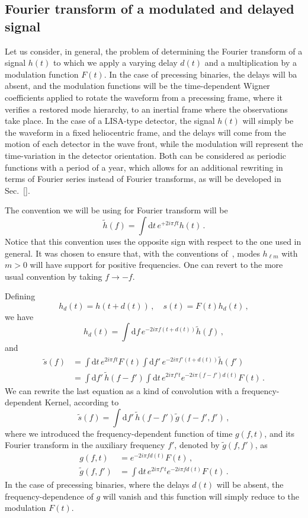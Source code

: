 \documentclass[aps,showpacs,%
prd,superscriptaddress,nofootinbib]{revtex4}
\newcommand{\be}{\begin{equation}}
\newcommand{\ee}{\end{equation}}
\newcommand\ud{{\mathrm{d}}}
\newcommand{\nn}{\nonumber}
\begin{document}

\subsection{Fourier transform of a modulated and delayed signal}
\label{subsec:FTgeneral}

Let us consider, in general, the problem of determining the Fourier transform of a signal $h(t)$ to which we apply a varying delay $d(t)$ and a multiplication by a modulation function $F(t)$. In the case of precessing binaries, the delays will ba absent, and the modulation functions will be the time-dependent Wigner coefficients applied to rotate the waveform from a precessing frame, where it verifies a restored mode hierarchy, to an inertial frame where the observations take place. In the case of a LISA-type detector, the signal $h(t)$ will simply be the waveform in a fixed heliocentric frame, and the delays will come from the motion of each detector in the wave front, while the modulation will represent the time-variation in the detector orientation. Both can be considered as periodic functions with a period of a year, which allows for an additional rewriting in terms of Fourier series instead of Fourier transforms, as will be developed in Sec.~\ref{}. 

The convention we will be using for Fourier transform will be
%
\be\label{eq:defFT}
	\tilde{h}(f) =  \int \ud t \, e^{+2i\pi f t} h(t) \,.
\ee
%
Notice that this convention uses the opposite sign with respect to the one used in general. It was chosen to ensure that, with the conventions of~\cite{}, modes $h_{\ell m}$ with $m>0$ will have support for positive frequencies. One can revert to the more usual convention by taking $f\rightarrow -f$.

Defining
%
\be
	h_{d}(t) = h(t+d(t)) \,, \quad s(t) = F(t)h_{d}(t) \,,
\ee
%
we have
%
\be
	h_{d}(t) = \int \ud f \, e^{-2i\pi f (t+d(t))}\tilde{h}(f) \,,
\ee
%
and
%
\begin{align}
	\tilde{s}(f) &= \int \ud t \, e^{2i\pi f t} F(t)  \int \ud f' \, e^{-2i\pi f' (t+d(t))}\tilde{h}(f') \nn\\
	&= \int \ud f' \, \tilde{h}(f-f') \int \ud t \, e^{2i\pi f' t} e^{-2i\pi (f-f') d(t)} F(t) \,.
\end{align}
%
We can rewrite the last equation as a kind of convolution with a frequency-dependent Kernel, according to
%
\be\label{eq:FDkernel}
	\tilde{s}(f) = \int \ud f' \, \tilde{h}(f-f') \tilde{g}(f-f',f') \,,
\ee
%
where we introduced the frequency-dependent function of time $g(f,t)$, and its Fourier transform in the auxiliary frequency $f'$, denoted by $\tilde{g}(f,f')$, as
%
\begin{subequations}
\begin{align}\label{eq:defg}
	g(f,t) &= e^{-2i\pi f d(t)} F(t) \,, \\
	\tilde{g}(f,f') &= \int \ud t \, e^{2i\pi f' t} e^{-2i\pi f d(t)} F(t) \,.
\end{align}
\end{subequations}
%
In the case of precessing binaries, where the delays $d(t)$ will be absent, the frequency-dependence of $g$ will vanish and this function will simply reduce to the modulation $F(t)$.
\end{document}
